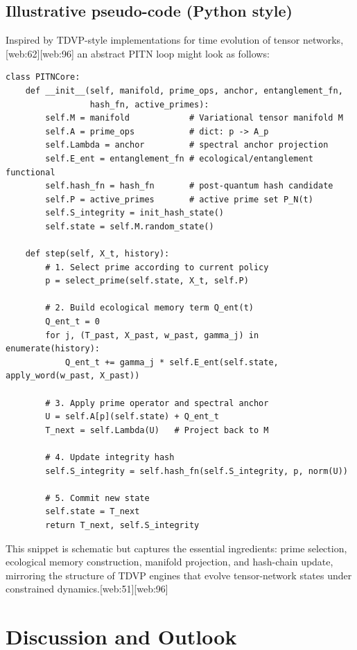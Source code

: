 \documentclass[11pt]{article}
\begin{document}
\subsection{Illustrative pseudo-code (Python style)}

Inspired by TDVP-style implementations for time evolution of tensor networks,[web:62][web:96] an abstract PITN loop might look as follows:

\begin{verbatim}
class PITNCore:
    def __init__(self, manifold, prime_ops, anchor, entanglement_fn,
                 hash_fn, active_primes):
        self.M = manifold            # Variational tensor manifold M
        self.A = prime_ops           # dict: p -> A_p
        self.Lambda = anchor         # spectral anchor projection
        self.E_ent = entanglement_fn # ecological/entanglement functional
        self.hash_fn = hash_fn       # post-quantum hash candidate
        self.P = active_primes       # active prime set P_N(t)
        self.S_integrity = init_hash_state()
        self.state = self.M.random_state()

    def step(self, X_t, history):
        # 1. Select prime according to current policy
        p = select_prime(self.state, X_t, self.P)

        # 2. Build ecological memory term Q_ent(t)
        Q_ent_t = 0
        for j, (T_past, X_past, w_past, gamma_j) in enumerate(history):
            Q_ent_t += gamma_j * self.E_ent(self.state, apply_word(w_past, X_past))

        # 3. Apply prime operator and spectral anchor
        U = self.A[p](self.state) + Q_ent_t
        T_next = self.Lambda(U)   # Project back to M

        # 4. Update integrity hash
        self.S_integrity = self.hash_fn(self.S_integrity, p, norm(U))

        # 5. Commit new state
        self.state = T_next
        return T_next, self.S_integrity
\end{verbatim}

This snippet is schematic but captures the essential ingredients: prime selection, ecological memory construction, manifold projection, and hash-chain update, mirroring the structure of TDVP engines that evolve tensor-network states under constrained dynamics.[web:51][web:96]

\section{Discussion and Outlook}
\end{document}
